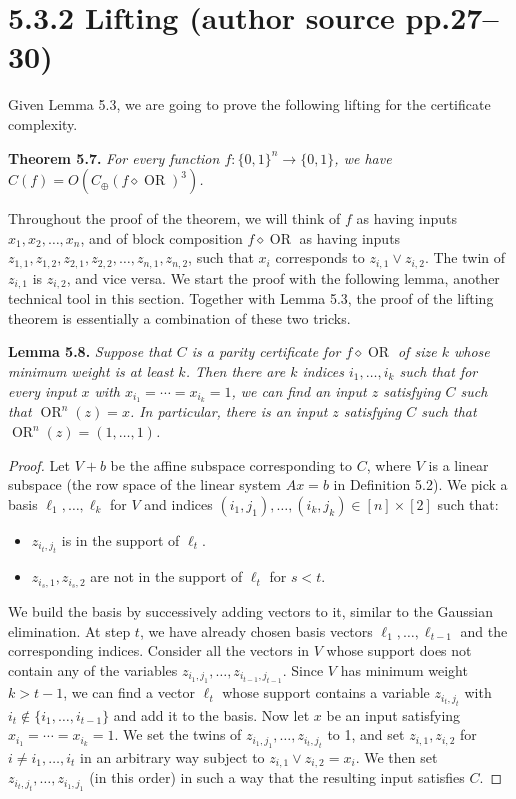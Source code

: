 \documentclass[10pt,a4paper]{article}
\newcommand{\bits}{\{0,1\}}
\newcommand{\comp}{\diamond}
\newcommand{\OR}{\operatorname{OR}}
\newenvironment{originalresult}[1]{\par\medskip\noindent\textbf{#1.}\itshape}{\par\medskip}
\begin{document}
\section*{5.3.2 Lifting (author source pp.27--30)}
Given Lemma 5.3, we are going to prove the following lifting for the certificate complexity.
\begin{originalresult}{Theorem 5.7}
For every function $f:\bits^n\to\bits$, we have $C(f)=O(C_\oplus(f\comp\OR)^3)$.
\end{originalresult}
Throughout the proof of the theorem, we will think of $f$ as having inputs $x_1,x_2,\ldots,x_n$, and of block composition $f\comp\OR$ as having inputs $z_{1,1},z_{1,2},z_{2,1},z_{2,2},\ldots,z_{n,1},z_{n,2}$, such that $x_i$ corresponds to $z_{i,1}\vee z_{i,2}$. The twin of $z_{i,1}$ is $z_{i,2}$, and vice versa. We start the proof with the following lemma, another technical tool in this section. Together with Lemma 5.3, the proof of the lifting theorem is essentially a combination of these two tricks.
\begin{originalresult}{Lemma 5.8}
Suppose that $C$ is a parity certificate for $f\comp\OR$ of size $k$ whose minimum weight is at least $k$. Then there are $k$ indices $i_1,\ldots,i_k$ such that for every input $x$ with $x_{i_1}=\cdots=x_{i_k}=1$, we can find an input $z$ satisfying $C$ such that $\OR^n(z)=x$. In particular, there is an input $z$ satisfying $C$ such that $\OR^n(z)=(1,\ldots,1)$.
\end{originalresult}
\begin{proof}
Let $V+b$ be the affine subspace corresponding to $C$, where $V$ is a linear subspace (the row space of the linear system $Ax=b$ in Definition 5.2). We pick a basis $\ell_1,\ldots,\ell_k$ for $V$ and indices $(i_1,j_1),\ldots,(i_k,j_k)\in[n]\times[2]$ such that:
\begin{itemize}
\item $z_{i_t,j_t}$ is in the support of $\ell_t$.
\item $z_{i_s,1},z_{i_s,2}$ are not in the support of $\ell_t$ for $s<t$.
\end{itemize}
We build the basis by successively adding vectors to it, similar to the Gaussian elimination. At step $t$, we have already chosen basis vectors $\ell_1,\ldots,\ell_{t-1}$ and the corresponding indices. Consider all the vectors in $V$ whose support does not contain any of the variables $z_{i_1,j_1},\ldots,z_{i_{t-1},j_{t-1}}$. Since $V$ has minimum weight $k>t-1$, we can find a vector $\ell_t$ whose support contains a variable $z_{i_t,j_t}$ with $i_t\notin\{i_1,\ldots,i_{t-1}\}$ and add it to the basis.
Now let $x$ be an input satisfying $x_{i_1}=\cdots=x_{i_k}=1$. We set the twins of $z_{i_1,j_1},\ldots,z_{i_t,j_t}$ to 1, and set $z_{i,1},z_{i,2}$ for $i\ne i_1,\ldots,i_t$ in an arbitrary way subject to $z_{i,1}\vee z_{i,2}=x_i$. We then set $z_{i_t,j_t},\ldots,z_{i_1,j_1}$ (in this order) in such a way that the resulting input satisfies $C$.
\end{proof}
\end{document}
